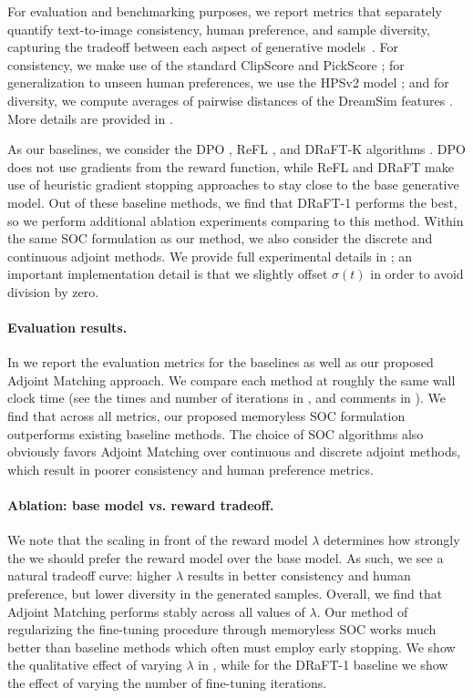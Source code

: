 \documentclass[]{fairmeta}
\begin{document}
For evaluation and benchmarking purposes, we report metrics that separately quantify text-to-image consistency, human preference, and sample diversity, capturing the tradeoff between each aspect of generative models~\citep{astolfi2024consistency}. For consistency, we make use of the standard ClipScore \citep{hessel2021clipscore} and PickScore \citep{kirstain2023pickapic}; for generalization to unseen human preferences, we use the HPSv2 model \citep{wu2023human}; and for diversity, we compute averages of pairwise distances of the DreamSim features \citep{fu2023learning}. More details are provided in .

As our baselines, we consider the DPO \citep{wallace2023diffusion}, ReFL \citep{xu2023imagereward}, and DRaFT-K algorithms \citep{clark2024directly}. DPO does not use gradients from the reward function, while ReFL and DRaFT make use of heuristic gradient stopping approaches to stay close to the base generative model. 
Out of these baseline methods, we find that DRaFT-1 performs the best, so we perform additional ablation experiments comparing to this method.
Within the same SOC formulation as our method, we also consider the discrete and continuous adjoint methods. We provide full experimental details in ; an important implementation detail is that we slightly offset $\sigma(t)$ in order to avoid division by zero.

\paragraph{Evaluation results.} In  we report the evaluation metrics for the baselines as well as our proposed Adjoint Matching approach. We compare each method at roughly the same wall clock time (see the times and number of iterations in , and comments in ).
We find that across all metrics, our proposed memoryless SOC formulation outperforms existing baseline methods. The choice of SOC algorithms also obviously favors Adjoint Matching over continuous and discrete adjoint methods, which result in poorer consistency and human preference metrics.

\paragraph{Ablation: base model vs. reward tradeoff.} We note that the scaling in front of the reward model $\lambda$ determines how strongly the we should prefer the reward model over the base model. As such, we see a natural tradeoff curve: higher $\lambda$ results in better consistency and human preference, but lower diversity in the generated samples. Overall, we find that Adjoint Matching performs stably across all values of $\lambda$. Our method of regularizing the fine-tuning procedure through memoryless SOC works much better than baseline methods which often must employ early stopping. We show the qualitative effect of varying $\lambda$ in , while for the DRaFT-1 baseline we show the effect of varying the number of fine-tuning iterations.
\end{document}
